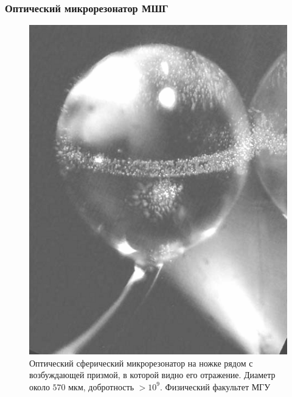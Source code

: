 \documentclass{beamer}
\begin{document}
    \begin{frame}\frametitle{Оптический микрорезонатор МШГ}

        \begin{figure}[h]
            \centering
            \includegraphics[width=\textwidth,height=0.6\textheight,keepaspectratio]{spherical_resonator}
            \caption[]{Оптический сферический микрорезонатор на ножке рядом с возбуждающей призмой, в которой видно его отражение. Диаметр около $570$ мкм, добротность $> 10^9$. Физический факультет МГУ \cite{microresonators}}
            \label{fig:spherical_resonator}
        \end{figure}

    \end{frame}

\end{document}
